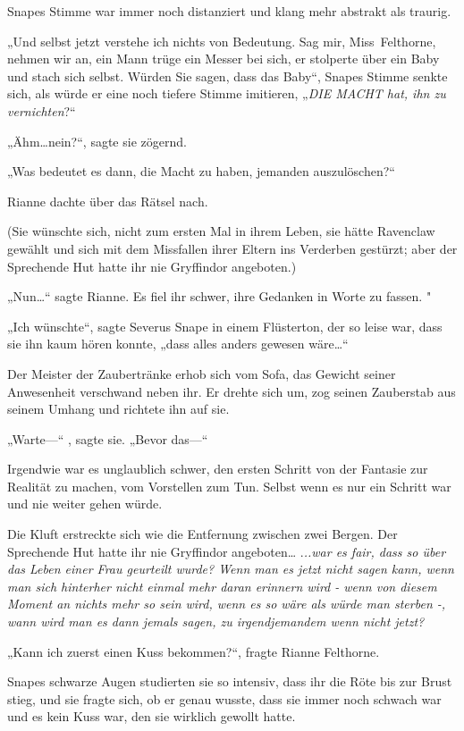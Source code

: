 {Snapes Stimme war immer noch distanziert und klang mehr abstrakt als traurig.

„Und selbst jetzt verstehe ich nichts von Bedeutung. Sag mir, Miss~Felthorne, nehmen wir an, ein Mann trüge ein Messer bei sich, er stolperte über ein Baby und stach sich selbst. Würden Sie sagen, dass das Baby“, Snapes Stimme senkte sich, als würde er eine noch tiefere Stimme imitieren, „\emph{DIE MACHT hat, ihn zu vernichten}?“

„Ähm…nein?“, sagte sie zögernd.

„Was bedeutet es dann, die Macht zu haben, jemanden auszulöschen?“

Rianne dachte über das Rätsel nach.

(Sie wünschte sich, nicht zum ersten Mal in ihrem Leben, sie hätte Ravenclaw gewählt und sich mit dem Missfallen ihrer Eltern ins Verderben gestürzt; aber der Sprechende Hut hatte ihr nie Gryffindor angeboten.)

„Nun…“ sagte Rianne. Es fiel ihr schwer, ihre Gedanken in Worte zu fassen. "

„Ich wünschte“, sagte Severus Snape in einem Flüsterton, der so leise war, dass sie ihn kaum hören konnte, „dass alles anders gewesen wäre…“

Der Meister der Zaubertränke erhob sich vom Sofa, das Gewicht seiner Anwesenheit verschwand neben ihr. Er drehte sich um, zog seinen Zauberstab aus seinem Umhang und richtete ihn auf sie.

„Warte—“ , sagte sie. „Bevor das—“

Irgendwie war es unglaublich schwer, den ersten Schritt von der Fantasie zur Realität zu machen, vom Vorstellen zum Tun. Selbst wenn es nur ein Schritt war und nie weiter gehen würde.

Die Kluft erstreckte sich wie die Entfernung zwischen zwei Bergen. Der Sprechende Hut hatte ihr nie Gryffindor angeboten… .\emph{..war es fair, dass so über das Leben einer Frau geurteilt wurde? Wenn man es jetzt nicht sagen kann, wenn man sich hinterher nicht einmal mehr daran erinnern wird - wenn von diesem Moment an nichts mehr so sein wird, wenn es so wäre als würde man sterben -, wann wird man es dann jemals sagen, zu irgendjemandem wenn nicht jetzt?}

„Kann ich zuerst einen Kuss bekommen?“, fragte Rianne Felthorne.

Snapes schwarze Augen studierten sie so intensiv, dass ihr die Röte bis zur Brust stieg, und sie fragte sich, ob er genau wusste, dass sie immer noch schwach war und es kein Kuss war, den sie wirklich gewollt hatte.

}
